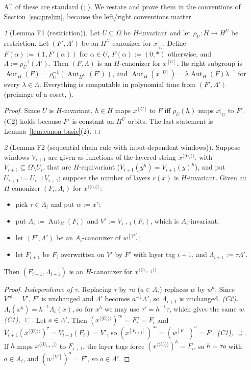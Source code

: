 \documentclass[11pt]{article}
\theoremstyle{plain}
\theoremstyle{definition}
\theoremstyle{remark}
\theoremstyle{named}
\newtheorem*{named}{}
\theoremstyle{namedrm}
\newcommand{\Aut}{\operatorname{Aut}}
\newcommand{\win}[2]{#1^{[#2]}}
\newcommand{\lay}[2]{#1^{\langle\!\langle #2\rangle\!\rangle}}
\begin{document}
All of these are standard (\cite[\S2]{BL83}; \cite[\S\S5, 8]{Bab19}). We restate and prove them in the
conventions of Section~\ref{sec:prelim}, because the left/right conventions matter.

\begin{named}[Lemma F1 (restriction)]
Let $U\subseteq\Omega$ be $H$-invariant and let $\rho_U\colon H\to H^U$ be restriction. Let $(F',\Lambda')$ be
an $H^U$-canonizer for $x|_U$. Define $F(\alpha):=(1,F'(\alpha))$ for $\alpha\in U$, $F(\alpha):=(0,*)$ otherwise,
and $\Lambda:=\rho_U^{-1}(\Lambda')$. Then $(F,\Lambda)$ is an $H$-canonizer for $\win{x}{U}$. Its right subgroup is
$\Aut_H(F)=\rho_U^{-1}(\Aut_{H^U}(F'))$, and $\Aut_H(\win{x}{U})=\lambda\Aut_H(F)\lambda^{-1}$ for every
$\lambda\in\Lambda$. Everything is computable in polynomial time from $(F',\Lambda')$ (preimage of a coset,
\cite[Thm.~2.1]{GNS}).
\end{named}
\begin{proof}
Since $U$ is $H$-invariant, $h\in H$ maps $\win{x}{U}$ to $F$ iff $\rho_U(h)$ maps $x|_U$ to $F'$. (C2) holds
because $F'$ is constant on $H^U$-orbits. The last statement is Lemma~\ref{lem:canon-basic}(2).
\end{proof}

\begin{named}[Lemma F2 (sequential chain rule with input-dependent windows)]
Suppose windows $V_{i+1}$ are given as functions of the layered string $\lay{x}{U_i}$, with
$V_{i+1}\subseteq\Omega\setminus U_i$, that are $H$-equivariant ($V_{i+1}(y^h)=V_{i+1}(y)^h$), and put
$U_{i+1}:=U_i\sqcup V_{i+1}$; suppose the number of layers $r(x)$ is $H$-invariant. Given an $H$-canonizer
$(F_i,\Lambda_i)$ for $\lay{x}{U_i}$:
\begin{itemize}
\item pick $\tau\in\Lambda_i$ and put $w:=x^\tau$;
\item put $A_i:=\Aut_H(F_i)$ and $V':=V_{i+1}(F_i)$, which is $A_i$-invariant;
\item let $(F',\Lambda')$ be an $A_i$-canonizer of $\win{w}{V'}$;
\item let $F_{i+1}$ be $F_i$ overwritten on $V'$ by $F'$ with layer tag $i+1$, and $\Lambda_{i+1}:=\tau\Lambda'$.
\end{itemize}
Then $(F_{i+1},\Lambda_{i+1})$ is an $H$-canonizer for $\lay{x}{U_{i+1}}$.
\end{named}
\begin{proof}
\emph{Independence of $\tau$.} Replacing $\tau$ by $\tau a$ ($a\in A_i$) replaces $w$ by $w^a$. Since
$V'^a=V'$, $F'$ is unchanged and $\Lambda'$ becomes $a^{-1}\Lambda'$, so $\Lambda_{i+1}$ is unchanged.
\emph{(C2).} $\Lambda_i(x^h)=h^{-1}\Lambda_i(x)$, so for $x^h$ we may use $\tau'=h^{-1}\tau$, which gives the
same $w$.
\emph{(C1), $\subseteq$.} Let $a\in\Lambda'$. Then $(\lay{x}{U_i})^{\tau a}=F_i^a=F_i$ and
$V_{i+1}(\lay{x}{U_i})^\tau=V_{i+1}(F_i)=V'$, so $(\win{x}{V_{i+1}})^{\tau a}=(\win{w}{V'})^a=F'$.
\emph{(C1), $\supseteq$.} If $h$ maps $\lay{x}{U_{i+1}}$ to $F_{i+1}$, the layer tags force
$(\lay{x}{U_i})^h=F_i$, so $h=\tau a$ with $a\in A_i$, and $(\win{w}{V'})^a=F'$, so $a\in\Lambda'$.
\end{proof}
\end{document}
